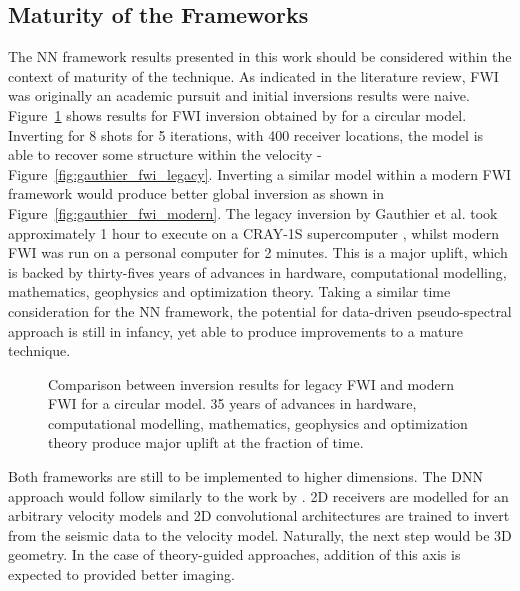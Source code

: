 \subsection{Maturity of the Frameworks}
The NN framework results presented in this work should be considered within the context of maturity of the technique. As indicated in the literature review, FWI was originally an academic pursuit and initial inversions results were naive. Figure~\ref{fig:gauthier_fwi} shows results for FWI inversion obtained by \citet{Gauthier1986} for a circular model. Inverting for 8 shots for 5 iterations, with 400 receiver locations, the model is able to recover some structure within the velocity - Figure~\ref{fig:gauthier_fwi_legacy}. Inverting a similar model within a modern FWI framework would produce better global inversion as shown in Figure~\ref{fig:gauthier_fwi_modern}. The legacy inversion by Gauthier et al. took approximately 1 hour to execute on a CRAY-1S supercomputer \citep{Kolodzey1981}, whilst modern FWI was run on a personal computer for 2 minutes. This is a major uplift, which is backed by thirty-fives years of advances in hardware, computational modelling, mathematics, geophysics and optimization theory. Taking a similar time consideration for the NN framework, the potential for data-driven pseudo-spectral approach is still in infancy, yet able to produce improvements to a mature technique.

\begin{figure}[!ht]
	\centering
	\caption[Comparison between inversion for legacy FWI and modern FWI.]{Comparison between inversion results for legacy FWI and modern FWI for a circular model. 35 years of advances in hardware, computational modelling, mathematics, geophysics and optimization theory produce major uplift at the fraction of time.}
	\label{fig:gauthier_fwi}
\end{figure}

Both frameworks are still to be implemented to higher dimensions. The DNN approach would follow similarly to the work by \cite{Liu2020}. 2D receivers are modelled for an arbitrary velocity models and 2D convolutional architectures are trained to invert from the seismic data to the velocity model. Naturally, the next step would be 3D geometry. In the case of theory-guided approaches, addition of this axis is expected to provided better imaging.

